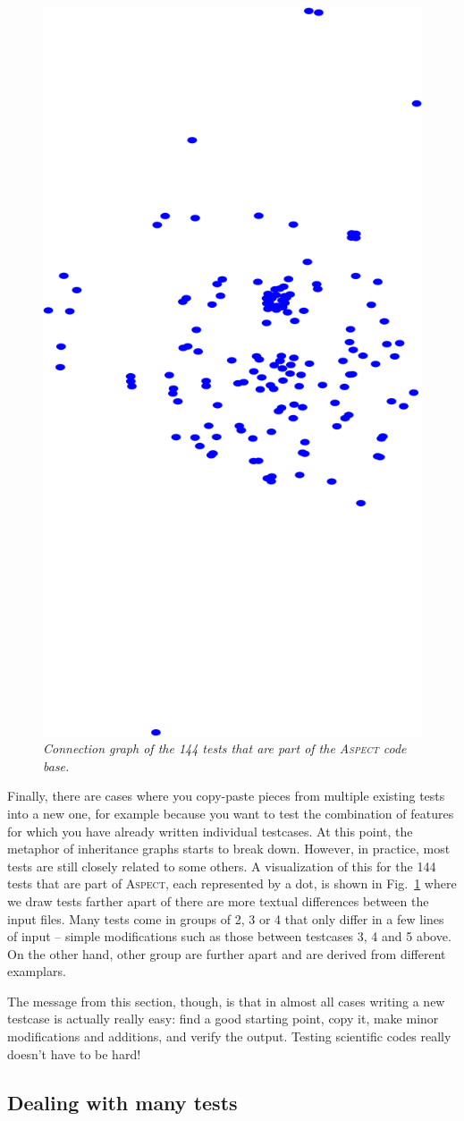 \documentclass{article}
\newcommand{\aspect}{\textsc{Aspect}}
\begin{document}
\begin{figure}
  \begin{center}
    \vspace*{-24pt}
    \includegraphics[height=0.45\textwidth,angle=-90]{figures/graph.png}
    \vspace*{-12pt}
  \end{center}
  \caption{\it Connection graph of the 144 tests that are part of the
    \aspect{} code base.}
  \vspace*{-3mm}
  \label{fig:aspect-tests}
\end{figure}
Finally, there are cases where you copy-paste pieces from multiple existing
tests into a new one, for example because you want to test the combination of
features for which you have already written individual testcases. At this
point, the metaphor of inheritance graphs starts to break down. However, in
practice, most tests are still closely related to some others. A visualization
of this for the 144 tests that are part of \aspect{}, each represented by a
dot, is shown in Fig.~\ref{fig:aspect-tests} where we draw tests farther apart
of there are more textual differences between the input files. Many tests come
in groups of 2, 3 or 4 that only differ in a few lines of input -- simple
modifications such as those between testcases 3, 4 and 5 above. On the other
hand, other group are further apart and are derived from different
examplars.

The message from this section, though, is that in almost all cases writing a
new testcase is actually really easy: find a good starting point, copy it,
make minor modifications and additions, and verify the output. Testing
scientific codes really doesn't have to be hard!

\subsection{Dealing with many tests}
\end{document}
